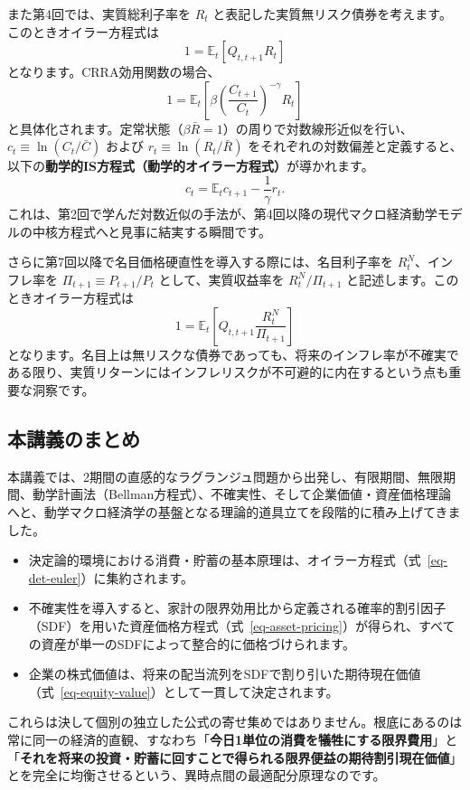 \documentclass[
  japanese,
  lualatex,
  ja=standard,
  12pt,
  a4paper]{ltjsarticle}
\providecommand{\tightlist}{%
  \setlength{\itemsep}{0pt}\setlength{\parskip}{0pt}}
\begin{document}
また第4回では、実質総利子率を \(R_t\)
と表記した実質無リスク債券を考えます。このときオイラー方程式は \[
1 = \mathbb{E}_t \left[ Q_{t,t+1} R_t \right]
\] となります。CRRA効用関数の場合、 \[
1 = \mathbb{E}_t \left[ \beta \left(\frac{C_{t+1}}{C_t}\right)^{-\gamma} R_t \right]
\]
と具体化されます。定常状態（\(\beta \bar{R} = 1\)）の周りで対数線形近似を行い、\(c_t \equiv \ln(C_t/\bar{C})\)
および \(r_t \equiv \ln(R_t/\bar{R})\)
をそれぞれの対数偏差と定義すると、以下の\textbf{動学的IS方程式（動学的オイラー方程式）}が導かれます。
\[
c_t = \mathbb{E}_t c_{t+1} - \frac{1}{\gamma} r_t.
\]
これは、第2回で学んだ対数近似の手法が、第4回以降の現代マクロ経済動学モデルの中核方程式へと見事に結実する瞬間です。

さらに第7回以降で名目価格硬直性を導入する際には、名目利子率を
\(R_t^N\)、インフレ率を \(\Pi_{t+1} \equiv P_{t+1}/P_t\)
として、実質収益率を \(R_t^N/\Pi_{t+1}\)
と記述します。このときオイラー方程式は \[
1 = \mathbb{E}_t \left[ Q_{t,t+1} \frac{R_t^N}{\Pi_{t+1}} \right]
\]
となります。名目上は無リスクな債券であっても、将来のインフレ率が不確実である限り、実質リターンにはインフレリスクが不可避的に内在するという点も重要な洞察です。

\subsection{本講義のまとめ}\label{ux672cux8b1bux7fa9ux306eux307eux3068ux3081}

本講義では、2期間の直感的なラグランジュ問題から出発し、有限期間、無限期間、動学計画法（Bellman方程式）、不確実性、そして企業価値・資産価格理論へと、動学マクロ経済学の基盤となる理論的道具立てを段階的に積み上げてきました。

\begin{itemize}
\tightlist
\item
  決定論的環境における消費・貯蓄の基本原理は、オイラー方程式（式~\ref{eq-det-euler}）に集約されます。
\item
  不確実性を導入すると、家計の限界効用比から定義される確率的割引因子（SDF）を用いた資産価格方程式（式~\ref{eq-asset-pricing}）が得られ、すべての資産が単一のSDFによって整合的に価格づけられます。
\item
  企業の株式価値は、将来の配当流列をSDFで割り引いた期待現在価値（式~\ref{eq-equity-value}）として一貫して決定されます。
\end{itemize}

これらは決して個別の独立した公式の寄せ集めではありません。根底にあるのは常に同一の経済的直観、すなわち「\textbf{今日1単位の消費を犠牲にする限界費用}」と「\textbf{それを将来の投資・貯蓄に回すことで得られる限界便益の期待割引現在価値}」とを完全に均衡させるという、異時点間の最適配分原理なのです。
\end{document}
